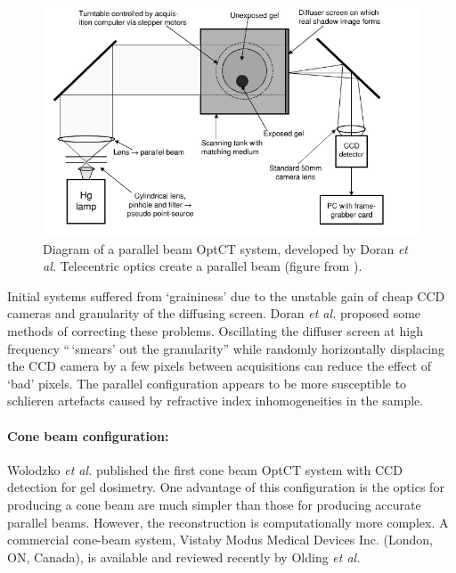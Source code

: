 \documentclass[12pt]{article}
\begin{document}
\begin{figure}[H]
\centering
\includegraphics[scale=0.6]{Doran_2001_ccdsetup.jpg}
\caption{Diagram of a parallel beam  OptCT system, developed by Doran \textit{et al.} Telecentric optics create a parallel beam  (figure from \cite{Doran:2001ee}). }
\label{fig:doran_ccd_setup}
\end{figure}



Initial systems  suffered from `graininess' due to the unstable gain of cheap CCD cameras and granularity of the diffusing screen. \cite{Doran:2001ee}   Doran \textit{et al.} proposed some methods of correcting these problems. Oscillating the diffuser screen at high frequency 
``\,`smears' out the granularity'' while randomly horizontally displacing the CCD camera by a few pixels  between acquisitions can reduce the effect of `bad'  pixels.
 \cite{Doran:2001ee}
 The parallel configuration appears to be more susceptible to schlieren artefacts caused by refractive index inhomogeneities in the sample. \cite{Krstajic:2007hk}






\paragraph{Cone beam configuration:}
Wolodzko \textit{et al.} published the first cone beam OptCT system with CCD detection for gel dosimetry.\cite{Wolodzko:1999} One advantage of this configuration is the optics for producing a cone beam are much simpler than those for producing accurate parallel beams. \cite{Doran:2008kh} However, the reconstruction is computationally more complex. \cite{hsieh2003computed} A commercial cone-beam system, Vista\texttrademark by Modus Medical Devices Inc. (London, ON, Canada),  is available and reviewed recently by Olding \textit{et al.} \cite{Olding:2011eta}
\end{document}
